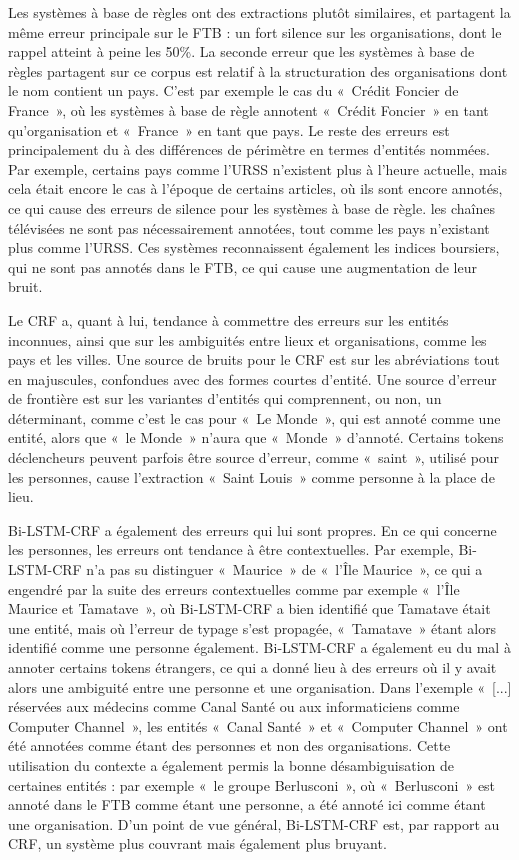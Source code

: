 \documentclass[PhD-Yoann-Dupont.tex]{subfiles}
\begin{document}
Les systèmes à base de règles ont des extractions plutôt similaires, et partagent la même erreur principale sur le FTB : un fort silence sur les organisations, dont le rappel atteint à peine les 50\%. La seconde erreur que les systèmes à base de règles partagent sur ce corpus est relatif à la structuration des organisations dont le nom contient un pays. C'est par exemple le cas du «\ Crédit Foncier de France\ », où les systèmes à base de règle annotent «\ Crédit Foncier\ » en tant qu'organisation et «\ France\ » en tant que pays. Le reste des erreurs est principalement du à des différences de périmètre en termes d'entités nommées. Par exemple, certains pays comme l'URSS n'existent plus à l'heure actuelle, mais cela était encore le cas à l'époque de certains articles, où ils sont encore annotés, ce qui cause des erreurs de silence pour les systèmes à base de règle. les chaînes télévisées ne sont pas nécessairement annotées, tout comme les pays n'existant plus comme l'URSS. Ces systèmes reconnaissent également les indices boursiers, qui ne sont pas annotés dans le FTB, ce qui cause une augmentation de leur bruit.

Le CRF a, quant à lui, tendance à commettre des erreurs sur les entités inconnues, ainsi que sur les ambiguités entre lieux et organisations, comme les pays et les villes. Une source de bruits pour le CRF est sur les abréviations tout en majuscules, confondues avec des formes courtes d'entité. Une source d'erreur de frontière est sur les variantes d'entités qui comprennent, ou non, un déterminant, comme c'est le cas pour «\ Le Monde\ », qui est annoté comme une entité, alors que «\ le Monde\ » n'aura que «\ Monde\ » d'annoté. Certains tokens déclencheurs peuvent parfois être source d'erreur, comme «\ saint\ », utilisé pour les personnes, cause l'extraction «\ Saint Louis\ » comme personne à la place de lieu.

Bi-LSTM-CRF a également des erreurs qui lui sont propres. En ce qui concerne les personnes, les erreurs ont tendance à être contextuelles. Par exemple, Bi-LSTM-CRF n'a pas su distinguer «\ Maurice\ » de  «\ l'Île Maurice\ », ce qui a engendré par la suite des erreurs contextuelles comme par exemple «\ l'Île Maurice et Tamatave\ », où Bi-LSTM-CRF a bien identifié que Tamatave était une entité, mais où l'erreur de typage s'est propagée, «\ Tamatave\ » étant alors identifié comme une personne également. Bi-LSTM-CRF a également eu du mal à annoter certains tokens étrangers, ce qui a donné lieu à des erreurs où il y avait alors une ambiguité entre une personne et une organisation. Dans l'exemple «\ [...] réservées aux médecins comme Canal Santé ou aux informaticiens comme Computer Channel\ », les entités «\ Canal Santé\ » et «\ Computer Channel\ » ont été annotées comme étant des personnes et non des organisations. Cette utilisation du contexte a également permis la bonne désambiguisation de certaines entités : par exemple «\ le groupe Berlusconi\ », où «\ Berlusconi\ » est annoté dans le FTB comme étant une personne, a été annoté ici comme étant une organisation. D'un point de vue général, Bi-LSTM-CRF est, par rapport au CRF, un système plus couvrant mais également plus bruyant.
\end{document}
